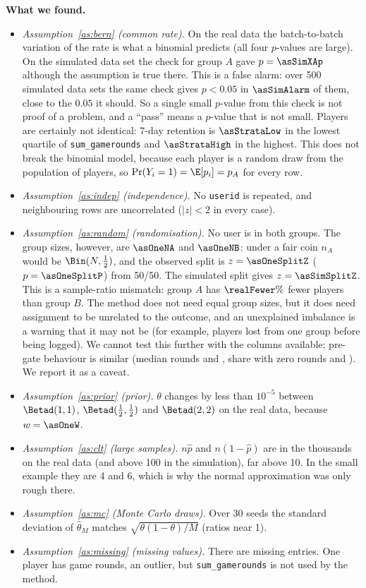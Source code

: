 \textbf{What we found.}
\begin{itemize}[nosep]
\item \emph{Assumption~\ref{as:bern} (common rate).} On the real data the batch-to-batch variation of the rate is
  what a binomial predicts (all four $p$-values are large). On the simulated data set the check for group $A$ gave
  $p=\asSimXAp$ although the assumption is true there. This is a false alarm: over 500 simulated data sets the same
  check gives $p<0.05$ in $\asSimAlarm$ of them, close to the $0.05$ it should. So a single small $p$-value from this
  check is not proof of a problem, and a ``pass'' means a $p$-value that is not small.
  Players are certainly not identical: 7-day retention is $\asStrataLow$ in the lowest quartile of
  \texttt{sum\_gamerounds} and $\asStrataHigh$ in the highest. This does not break the binomial model, because each
  player is a random draw from the population of players, so $\Pr(Y_i=1)=\E[p_i]=p_A$ for every row.
\item \emph{Assumption~\ref{as:indep} (independence).} No \texttt{userid} is repeated, and neighbouring rows are
  uncorrelated ($|z|<2$ in every case).
\item \emph{Assumption~\ref{as:random} (randomisation).} No user is in both groups. The group sizes, however, are
  $\asOneNA$ and $\asOneNB$: under a fair coin $n_A$ would be $\Bin(N,\frac12)$, and the observed split is
  $z=\asOneSplitZ$ ($p=\asOneSplitP$) from 50/50. The simulated split gives $z=\asSimSplitZ$. This is a sample-ratio
  mismatch: group $A$ has $\realFewer\%$ fewer players than group $B$. The method does not need equal group sizes, but it does need assignment to be unrelated
  to the outcome, and an unexplained imbalance is a warning that it may not be (for example, players lost from one
  group before being logged). We cannot test this further with the columns available; pre-gate behaviour is similar
  (median rounds \asMedA{} and \asMedB, share with zero rounds \asZeroA{} and \asZeroB). We report it as a caveat.
\item \emph{Assumption~\ref{as:prior} (prior).} $\theta$ changes by less than $10^{-5}$ between $\Betad(1,1)$,
  $\Betad(\frac12,\frac12)$ and $\Betad(2,2)$ on the real data, because $w=\asOneW$.
\item \emph{Assumption~\ref{as:clt} (large samples).} $n\hat p$ and $n(1-\hat p)$ are in the thousands on the real
  data (and above 100 in the simulation), far above 10. In the small example they are 4 and 6, which is why the
  normal approximation was only rough there.
\item \emph{Assumption~\ref{as:mc} (Monte Carlo draws).} Over 30 seeds the standard deviation of $\hat\theta_M$
  matches $\sqrt{\theta(1-\theta)/M}$ (ratios near 1).
\item \emph{Assumption~\ref{as:missing} (missing values).} There are \asMissing{} missing entries. One player has
  \asMaxRounds{} game rounds, an outlier, but \texttt{sum\_gamerounds} is not used by the method.
\end{itemize}

